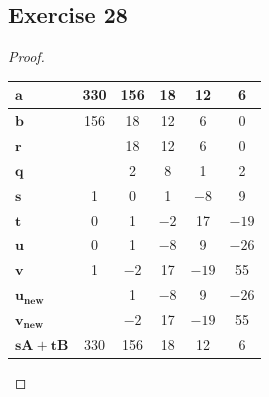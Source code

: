 \documentclass[14pt]{extarticle}
\begin{document}
\subsection{Exercise 28}
\begin{proof}
        \begin{center}
                \begin{tabular}{|l|c|c|c|c|c|}
                        \hline
                        \(\bm{a}\)       & 330 & 156  & 18   & 12    & 6     \\
                        \hline
                        \(\bm{b}\)       & 156 & 18   & 12   & 6     & 0     \\
                        \hline
                        \(\bm{r}\)       &     & 18   & 12   & 6     & 0     \\
                        \hline
                        \(\bm{q}\)       &     & 2    & 8    & 1     & 2     \\
                        \hline
                        \(\bm{s}\)       & 1   & 0    & 1    & $-8$  & 9     \\
                        \hline
                        \(\bm{t}\)       & 0   & 1    & $-2$ & 17    & $-19$ \\
                        \hline
                        \(\bm{u}\)       & 0   & 1    & $-8$ & 9     & $-26$ \\
                        \hline
                        \(\bm{v}\)       & 1   & $-2$ & 17   & $-19$ & 55    \\
                        \hline
                        \(\bm{u_{new}}\) &     & 1    & $-8$ & 9     & $-26$ \\
                        \hline
                        \(\bm{v_{new}}\) &     & $-2$ & 17   & $-19$ & 55    \\
                        \hline
                        \(\bm{sA+tB}\)   & 330 & 156  & 18   & 12    & 6     \\
                        \hline
                \end{tabular}
        \end{center}
\end{proof}
\end{document}
